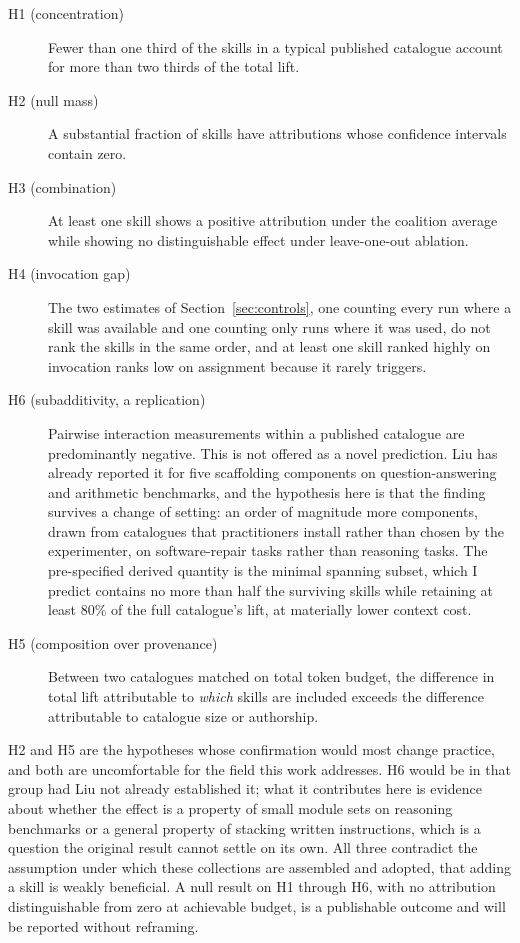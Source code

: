 \documentclass[11pt]{article}
\theoremstyle{plain}
\theoremstyle{definition}
\theoremstyle{remark}
\begin{document}
\begin{description}
\item[H1 (concentration)] Fewer than one third of the skills in a typical published catalogue account for more than two thirds of the total lift.
\item[H2 (null mass)] A substantial fraction of skills have attributions whose confidence intervals contain zero.
\item[H3 (combination)] At least one skill shows a positive attribution under the coalition average while showing no distinguishable effect under leave-one-out ablation.
\item[H4 (invocation gap)] The two estimates of Section~\ref{sec:controls}, one counting every run where a skill was available and one counting only runs where it was used, do not rank the skills in the same order, and at least one skill ranked highly on invocation ranks low on assignment because it rarely triggers.
\item[H6 (subadditivity, a replication)] Pairwise interaction measurements within a published catalogue are predominantly negative. This is not offered as a novel prediction. Liu \cite{mliu} has already reported it for five scaffolding components on question-answering and arithmetic benchmarks, and the hypothesis here is that the finding survives a change of setting: an order of magnitude more components, drawn from catalogues that practitioners install rather than chosen by the experimenter, on software-repair tasks rather than reasoning tasks. The pre-specified derived quantity is the minimal spanning subset, which I predict contains no more than half the surviving skills while retaining at least $80\%$ of the full catalogue's lift, at materially lower context cost.
\item[H5 (composition over provenance)] Between two catalogues matched on total token budget, the difference in total lift attributable to \emph{which} skills are included exceeds the difference attributable to catalogue size or authorship.
\end{description}

H2 and H5 are the hypotheses whose confirmation would most change practice, and both are uncomfortable for the field this work addresses. H6 would be in that group had Liu not already established it; what it contributes here is evidence about whether the effect is a property of small module sets on reasoning benchmarks or a general property of stacking written instructions, which is a question the original result cannot settle on its own. All three contradict the assumption under which these collections are assembled and adopted, that adding a skill is weakly beneficial. A null result on H1 through H6, with no attribution distinguishable from zero at achievable budget, is a publishable outcome and will be reported without reframing.
\end{document}
